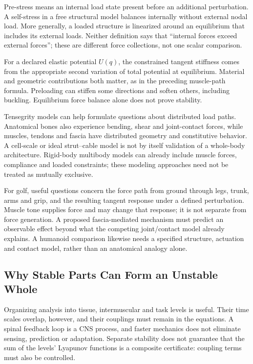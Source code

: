 Pre-stress means an internal load state present before an additional perturbation.
A self-stress in a free structural model balances internally without external
nodal load. More generally, a loaded structure is linearized around an equilibrium
that includes its external loads. Neither definition says that ``internal forces
exceed external forces''; these are different force collections, not one scalar
comparison.

For a declared elastic potential $U(q)$, the constrained tangent stiffness comes
from the appropriate second variation of total potential at equilibrium. Material
and geometric contributions both matter, as in the preceding muscle-path formula.
Preloading can stiffen some directions and soften others, including buckling.
Equilibrium force balance alone does not prove stability.

Tensegrity models can help formulate questions about distributed load paths.
Anatomical bones also experience bending, shear and joint-contact forces, while
muscles, tendons and fascia have distributed geometry and constitutive behavior.
A cell-scale or ideal strut--cable model is not by itself validation of a
whole-body architecture. Rigid-body multibody models can already include muscle
forces, compliance and loaded constraints; these modeling approaches need not
be treated as mutually exclusive.

For golf, useful questions concern the force path from ground through legs,
trunk, arms and grip, and the resulting tangent response under a defined
perturbation. Muscle tone supplies force and may change that response; it is
not separate from force generation. A proposed fascia-mediated mechanism must
predict an observable effect beyond what the competing joint/contact model
already explains. A humanoid comparison likewise needs a specified structure,
actuation and contact model, rather than an anatomical analogy alone.

\subsection{Why Stable Parts Can Form an Unstable Whole}

Organizing analysis into tissue, intermuscular and task levels is useful.
Their time scales overlap, however, and their couplings must remain in the
equations. A spinal feedback loop is a CNS process, and faster mechanics does
not eliminate sensing, prediction or adaptation. Separate stability does not
guarantee that the sum of the levels' Lyapunov functions is a composite
certificate: coupling terms must also be controlled.

